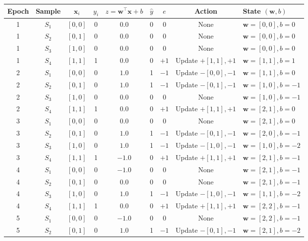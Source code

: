 \documentclass[11pt]{article}
\begin{document}
\begin{table}[H]
\centering
\small
\begin{tabular}{ccccccccl}
\toprule
\textbf{Epoch} & \textbf{Sample} & $\mathbf{x}_i$ & $y_i$ & $z = \mathbf{w}^\top \mathbf{x} + b$ & $\hat{y}$ & $e$ & \textbf{Action} & \textbf{State $(\mathbf{w}, b)$} \\
\midrule
1 & $S_1$ & $[0, 0]$ & 0 & $0.0$ & 0 & 0 & None & $\mathbf{w}=[0, 0], b=0$ \\
1 & $S_2$ & $[0, 1]$ & 0 & $0.0$ & 0 & 0 & None & $\mathbf{w}=[0, 0], b=0$ \\
1 & $S_3$ & $[1, 0]$ & 0 & $0.0$ & 0 & 0 & None & $\mathbf{w}=[0, 0], b=0$ \\
1 & $S_4$ & $[1, 1]$ & 1 & $0.0$ & 0 & $+1$ & Update $+[1, 1], +1$ & $\mathbf{w}=[1, 1], b=1$ \\
\midrule
2 & $S_1$ & $[0, 0]$ & 0 & $1.0$ & 1 & $-1$ & Update $-[0, 0], -1$ & $\mathbf{w}=[1, 1], b=0$ \\
2 & $S_2$ & $[0, 1]$ & 0 & $1.0$ & 1 & $-1$ & Update $-[0, 1], -1$ & $\mathbf{w}=[1, 0], b=-1$ \\
2 & $S_3$ & $[1, 0]$ & 0 & $0.0$ & 0 & 0 & None & $\mathbf{w}=[1, 0], b=-1$ \\
2 & $S_4$ & $[1, 1]$ & 1 & $0.0$ & 0 & $+1$ & Update $+[1, 1], +1$ & $\mathbf{w}=[2, 1], b=0$ \\
\midrule
3 & $S_1$ & $[0, 0]$ & 0 & $0.0$ & 0 & 0 & None & $\mathbf{w}=[2, 1], b=0$ \\
3 & $S_2$ & $[0, 1]$ & 0 & $1.0$ & 1 & $-1$ & Update $-[0, 1], -1$ & $\mathbf{w}=[2, 0], b=-1$ \\
3 & $S_3$ & $[1, 0]$ & 0 & $1.0$ & 1 & $-1$ & Update $-[1, 0], -1$ & $\mathbf{w}=[1, 0], b=-2$ \\
3 & $S_4$ & $[1, 1]$ & 1 & $-1.0$ & 0 & $+1$ & Update $+[1, 1], +1$ & $\mathbf{w}=[2, 1], b=-1$ \\
\midrule
4 & $S_1$ & $[0, 0]$ & 0 & $-1.0$ & 0 & 0 & None & $\mathbf{w}=[2, 1], b=-1$ \\
4 & $S_2$ & $[0, 1]$ & 0 & $0.0$ & 0 & 0 & None & $\mathbf{w}=[2, 1], b=-1$ \\
4 & $S_3$ & $[1, 0]$ & 0 & $1.0$ & 1 & $-1$ & Update $-[1, 0], -1$ & $\mathbf{w}=[1, 1], b=-2$ \\
4 & $S_4$ & $[1, 1]$ & 1 & $0.0$ & 0 & $+1$ & Update $+[1, 1], +1$ & $\mathbf{w}=[2, 2], b=-1$ \\
\midrule
5 & $S_1$ & $[0, 0]$ & 0 & $-1.0$ & 0 & 0 & None & $\mathbf{w}=[2, 2], b=-1$ \\
5 & $S_2$ & $[0, 1]$ & 0 & $1.0$ & 1 & $-1$ & Update $-[0, 1], -1$ & $\mathbf{w}=[2, 1], b=-2$ \\

\end{tabular}
\end{table}
\end{document}
